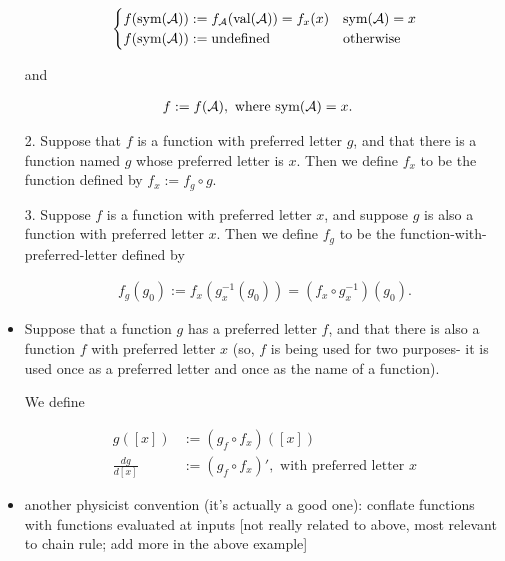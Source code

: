 \begin{itemize}
    \begin{align*}
        \begin{cases}
            f(\text{sym}(\mathcal{A})) := f_{\mathcal{A}}(\text{val}(\mathcal{A})) = f_x(x) & \text{sym}(\mathcal{A}) = x \\
            f(\text{sym}(\mathcal{A})) := \text{undefined} & \text{otherwise}
        \end{cases}
    \end{align*}
    
    and
    
    \begin{align*}
        f &:= f(\mathcal{A}), \text{ where $\text{sym}(\mathcal{A}) = x$}.
    \end{align*}
    
    2. Suppose that $f$ is a function with preferred letter $g$, and that there is a function named $g$ whose preferred letter is $x$. Then we define $f_x$ to be the function defined by $f_x := f_g \circ g$.

    3. Suppose $f$ is a function with preferred letter $x$, and suppose $g$ is also a function with preferred letter $x$. Then we define $f_g$ to be the function-with-preferred-letter defined by
    
    \begin{align*}
        f_g(g_0) := f_x(g_x^{-1}(g_0)) = (f_x \circ g_x^{-1})(g_0).
    \end{align*}
    
    \item Suppose that a function $g$ has a preferred letter $f$, and that there is also a function $f$ with preferred letter $x$ (so, $f$ is being used for two purposes- it is used once as a preferred letter and once as the name of a function).
    
    We define
    
    \begin{align*}
        g([x]) &:= (g_f \circ f_x)([x]) \\
        \frac{dg}{d[x]} &:= (g_f \circ f_x)', \text{ with preferred letter $x$}
    \end{align*}
    
     \item another physicist convention (it's actually a good one): conflate functions with functions evaluated at inputs [not really related to above, most relevant to chain rule; add more in the above example]
    
\end{itemize}